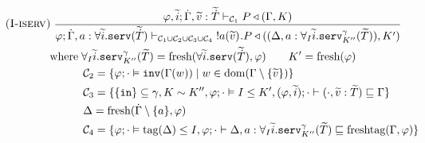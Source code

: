 \begin{table*}[!ht]
\begin{framed}
\begin{align*}
        &\kern-3em\runa{I-iserv}\;\infrule{ \varphi,\widetilde{i};\dot{\Gamma},\widetilde{v}:\widetilde{\dot{T}}\vdash_{\mathcal{C}_1} P \triangleleft (\Gamma,K) }{ \varphi;\dot{\Gamma},a : \forall\widetilde{i}.\texttt{serv}(\widetilde{\dot{T}}) \vdash_{ \mathcal{C}_1 \cup \mathcal{C}_2 \cup \mathcal{C}_3 \cup \mathcal{C}_4 }\; !\inputch{a}{\widetilde{v}}{}{P} \triangleleft ((\Delta,a : \forall_I\widetilde{i}.\texttt{serv}^{\gamma}_{K''}(\widetilde{T})), K')  }\\[-1em]
        &\kern1em\text{where}\;  \forall_I\widetilde{i}.\texttt{serv}^{\gamma}_{K''}(\widetilde{T}) = \text{fresh}(\forall\widetilde{i}.\texttt{serv}(\widetilde{\dot{T}}),\varphi)\kern2em K' = \text{fresh}(\varphi)\\
        &\kern4em \mathcal{C}_2 = \{ \varphi;\cdot\vDash\texttt{inv}(\Gamma(w)) \mid w\in\text{dom}(\Gamma \setminus \{\widetilde{v}\}) \}\\
        &\kern4em \mathcal{C}_3 = \{\{\texttt{in}\} \subseteq \gamma, K\sim K'',\varphi;\cdot\vDash I \leq K',(\varphi,\widetilde{i});\cdot\vdash(\cdot,\widetilde{v} : \widetilde{T}) \sqsubseteq \Gamma\}\\
        &\kern4em\Delta = \text{fresh}(\dot{\Gamma}\setminus\{a\},\varphi)\\ 
        &\kern4em\mathcal{C}_4 = \{\varphi;\cdot\vDash \text{tag}(\Delta) \leq I,\varphi;\cdot\vdash \Delta,a:\forall_I\widetilde{i}.\texttt{serv}^{\gamma}_{K''}(\widetilde{T}) \sqsubseteq \text{freshtag}(\Gamma,\varphi)\} \\

\end{align*}
\end{framed}
\end{table*}
